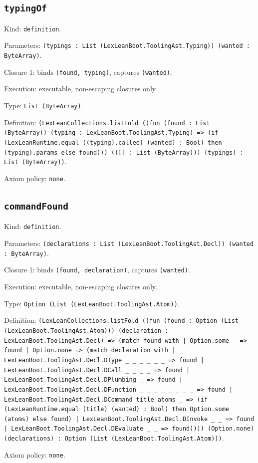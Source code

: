 \documentclass[11pt]{article}
\begin{document}
\subsection*{\texttt{typingOf}}
\noindent Kind: \texttt{definition}.\par
\noindent Parameters: \texttt{(typings : List (LexLeanBoot.ToolingAst.Typing)) (wanted : ByteArray)}.\par
\noindent Closure 1: binds \texttt{(found, typing)}, captures \texttt{(wanted)}.\par
\noindent Execution: executable, non-escaping closures only.\par
\noindent Type: \texttt{List (ByteArray)}.\par
\noindent Definition: \texttt{(LexLeanCollections.listFold ((fun (found : List (ByteArray)) (typing : LexLeanBoot.ToolingAst.Typing) => (if (LexLeanRuntime.equal ((typing).callee) (wanted) : Bool) then (typing).params else found))) (([] : List (ByteArray))) (typings) : List (ByteArray))}.\par
\noindent Axiom policy: \texttt{none}.\par
\subsection*{\texttt{commandFound}}
\noindent Kind: \texttt{definition}.\par
\noindent Parameters: \texttt{(declarations : List (LexLeanBoot.ToolingAst.Decl)) (wanted : ByteArray)}.\par
\noindent Closure 1: binds \texttt{(found, declaration)}, captures \texttt{(wanted)}.\par
\noindent Execution: executable, non-escaping closures only.\par
\noindent Type: \texttt{Option (List (LexLeanBoot.ToolingAst.Atom))}.\par
\noindent Definition: \texttt{(LexLeanCollections.listFold ((fun (found : Option (List (LexLeanBoot.ToolingAst.Atom))) (declaration : LexLeanBoot.ToolingAst.Decl) => (match found with | Option.some \_ => found | Option.none => (match declaration with | LexLeanBoot.ToolingAst.Decl.DType \_ \_ \_ \_ \_ \_ => found | LexLeanBoot.ToolingAst.Decl.DCall \_ \_ \_ \_ => found | LexLeanBoot.ToolingAst.Decl.DPlumbing \_ => found | LexLeanBoot.ToolingAst.Decl.DFunction \_ \_ \_ \_ \_ \_ \_ \_ => found | LexLeanBoot.ToolingAst.Decl.DCommand title atoms \_ => (if (LexLeanRuntime.equal (title) (wanted) : Bool) then Option.some (atoms) else found) | LexLeanBoot.ToolingAst.Decl.DInvoke \_ \_ => found | LexLeanBoot.ToolingAst.Decl.DEvaluate \_ \_ => found)))) (Option.none) (declarations) : Option (List (LexLeanBoot.ToolingAst.Atom)))}.\par
\noindent Axiom policy: \texttt{none}.\par
\end{document}
